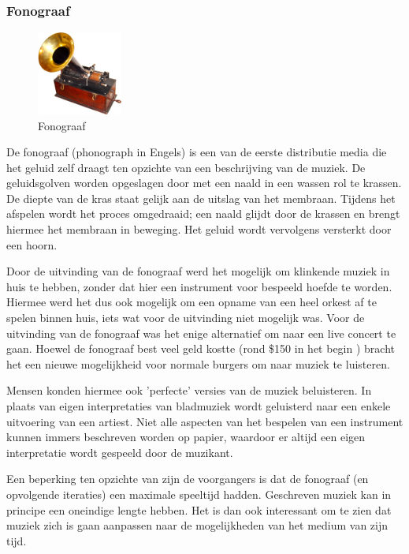 \subsubsection*{Fonograaf}
\begin{figure}
    \centering
    \includegraphics[width=0.25\textwidth]{assets/critical-review/EdisonPhonograph.jpg}
    \caption{Fonograaf}
    \label{fig:critical-review:phonograph}
\end{figure}

De fonograaf (phonograph in Engels) is een van de eerste distributie media die het geluid zelf draagt ten opzichte van een beschrijving van de muziek. De geluidsgolven worden opgeslagen door met een naald in een wassen rol te krassen. De diepte van de kras staat gelijk aan de uitslag van het membraan. Tijdens het afspelen wordt het proces omgedraaid; een naald glijdt door de krassen en brengt hiermee het membraan in beweging. Het geluid wordt vervolgens versterkt door een hoorn.

Door de uitvinding van de fonograaf werd het mogelijk om klinkende muziek in huis te hebben, zonder dat hier een instrument voor bespeeld hoefde te worden. Hiermee werd het dus ook mogelijk om een opname van een heel orkest af te spelen binnen huis, iets wat voor de uitvinding niet mogelijk was. Voor de uitvinding van de fonograaf was het enige alternatief om naar een live concert te gaan. Hoewel de fonograaf best veel geld kostte (rond \$150 in het begin \citep{historyofphonograph}) bracht het een nieuwe mogelijkheid voor normale burgers om naar muziek te luisteren.

Mensen konden hiermee ook 'perfecte' versies van de muziek beluisteren. In plaats van eigen interpretaties van bladmuziek wordt geluisterd naar een enkele uitvoering van een artiest. Niet alle aspecten van het bespelen van een instrument kunnen immers beschreven worden op papier, waardoor er altijd een eigen interpretatie wordt gespeeld door de muzikant.

Een beperking ten opzichte van zijn de voorgangers is dat de fonograaf (en opvolgende iteraties) een maximale speeltijd hadden. Geschreven muziek kan in principe een oneindige lengte hebben. Het is dan ook interessant om te zien dat muziek zich is gaan aanpassen naar de mogelijkheden van het medium van zijn tijd.

